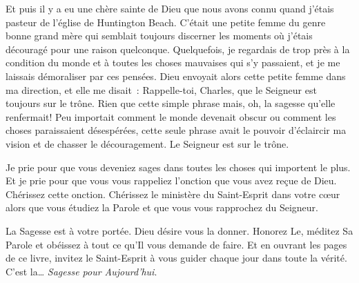 Et puis il y a eu une chère sainte de Dieu que nous avons connu quand
 j'étais pasteur de l'église de Huntington Beach.
 C'était une petite femme du genre bonne grand mère qui semblait
 toujours discerner les moments où j'étais découragé
 pour une raison quelconque. Quelquefois, je regardais de trop près à la
 condition du monde et à toutes les choses mauvaises qui s'y passaient,
 et je me laissais démoraliser par ces pensées.
 Dieu envoyait alors cette petite femme dans ma direction,
 et elle me disait~: \og Rappelle-toi, Charles, que le Seigneur est toujours
 sur le trône. \fg{}
 Rien que cette simple phrase mais, oh, la sagesse qu'elle renfermait!
 Peu importait comment le monde devenait obscur ou comment les choses
 paraissaient désespérées, cette seule phrase avait le pouvoir d'éclaircir
 ma vision et de chasser le découragement.
 \og Le Seigneur est sur le trône. \fg{}

Je prie pour que vous deveniez sages dans toutes les choses qui importent
 le plus. Et je prie pour que vous vous rappeliez l'onction que vous avez
 reçue de Dieu. Chérissez cette onction. Chérissez le ministère du
 Saint-Esprit dans votre c\oe{}ur alors que vous étudiez la Parole
 et que vous vous rapprochez du Seigneur.

La Sagesse est à votre portée. Dieu désire vous la donner. Honorez Le,
 méditez Sa Parole et obéissez à tout ce qu'Il vous demande de faire.
 Et en ouvrant les pages de ce livre, invitez le Saint-Esprit à vous guider
 chaque jour dans toute la vérité.
 C'est la\dots{} \emph{Sagesse pour Aujourd'hui}.

\signature{Chuck Smith}


